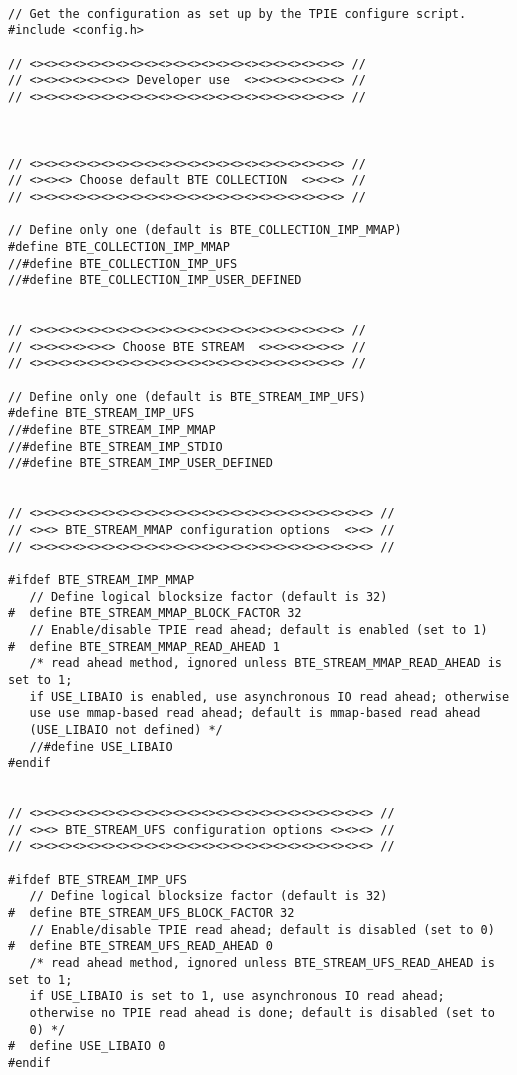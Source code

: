 \begin{verbatim}

// Get the configuration as set up by the TPIE configure script.
#include <config.h>

// <><><><><><><><><><><><><><><><><><><><><><> //
// <><><><><><><> Developer use  <><><><><><><> //
// <><><><><><><><><><><><><><><><><><><><><><> //



// <><><><><><><><><><><><><><><><><><><><><><> //
// <><><> Choose default BTE COLLECTION  <><><> //
// <><><><><><><><><><><><><><><><><><><><><><> //

// Define only one (default is BTE_COLLECTION_IMP_MMAP)
#define BTE_COLLECTION_IMP_MMAP
//#define BTE_COLLECTION_IMP_UFS
//#define BTE_COLLECTION_IMP_USER_DEFINED


// <><><><><><><><><><><><><><><><><><><><><><> //
// <><><><><><> Choose BTE STREAM  <><><><><><> //
// <><><><><><><><><><><><><><><><><><><><><><> //

// Define only one (default is BTE_STREAM_IMP_UFS)
#define BTE_STREAM_IMP_UFS
//#define BTE_STREAM_IMP_MMAP
//#define BTE_STREAM_IMP_STDIO
//#define BTE_STREAM_IMP_USER_DEFINED


// <><><><><><><><><><><><><><><><><><><><><><><><> //
// <><> BTE_STREAM_MMAP configuration options  <><> //
// <><><><><><><><><><><><><><><><><><><><><><><><> //

#ifdef BTE_STREAM_IMP_MMAP
   // Define logical blocksize factor (default is 32)
#  define BTE_STREAM_MMAP_BLOCK_FACTOR 32
   // Enable/disable TPIE read ahead; default is enabled (set to 1)
#  define BTE_STREAM_MMAP_READ_AHEAD 1
   /* read ahead method, ignored unless BTE_STREAM_MMAP_READ_AHEAD is set to 1;
   if USE_LIBAIO is enabled, use asynchronous IO read ahead; otherwise
   use use mmap-based read ahead; default is mmap-based read ahead
   (USE_LIBAIO not defined) */
   //#define USE_LIBAIO
#endif


// <><><><><><><><><><><><><><><><><><><><><><><><> //
// <><> BTE_STREAM_UFS configuration options <><><> //
// <><><><><><><><><><><><><><><><><><><><><><><><> //

#ifdef BTE_STREAM_IMP_UFS
   // Define logical blocksize factor (default is 32)
#  define BTE_STREAM_UFS_BLOCK_FACTOR 32
   // Enable/disable TPIE read ahead; default is disabled (set to 0)
#  define BTE_STREAM_UFS_READ_AHEAD 0
   /* read ahead method, ignored unless BTE_STREAM_UFS_READ_AHEAD is set to 1;
   if USE_LIBAIO is set to 1, use asynchronous IO read ahead;
   otherwise no TPIE read ahead is done; default is disabled (set to
   0) */
#  define USE_LIBAIO 0
#endif




\end{verbatim}

